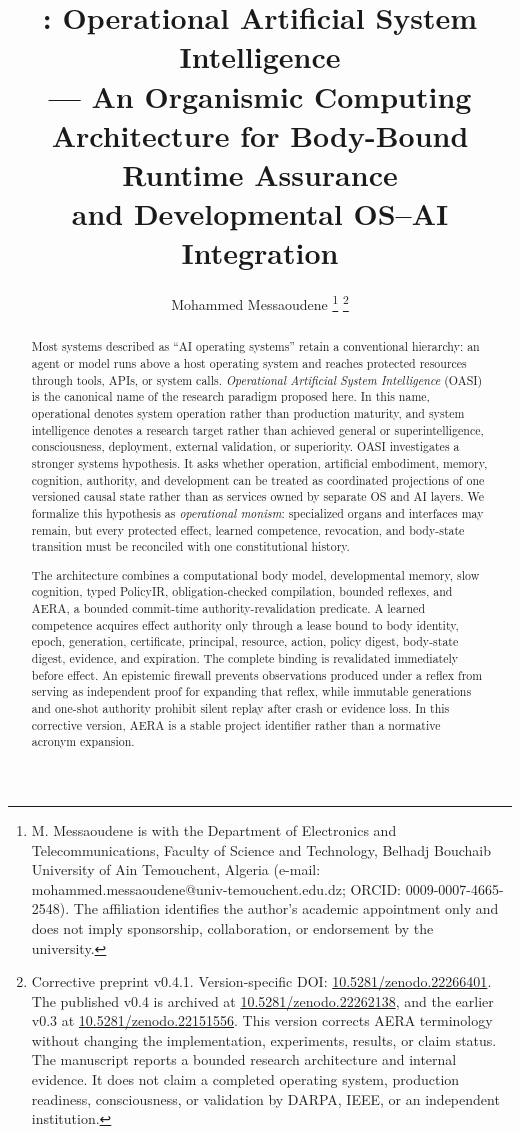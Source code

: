 \documentclass[journal,10pt]{IEEEtran}
\title{\OASI{}: Operational Artificial System Intelligence\\
{\large --- An Organismic Computing Architecture for Body-Bound Runtime Assurance\\
and Developmental OS--AI Integration}}
\author{Mohammed Messaoudene%
\thanks{M. Messaoudene is with the Department of Electronics and Telecommunications, Faculty of Science and Technology, Belhadj Bouchaib University of Ain Temouchent, Algeria (e-mail: mohammed.messaoudene@univ-temouchent.edu.dz; ORCID: 0009-0007-4665-2548). The affiliation identifies the author's academic appointment only and does not imply sponsorship, collaboration, or endorsement by the university.}%
\thanks{Corrective preprint v0.4.1. Version-specific DOI: \href{https://doi.org/10.5281/zenodo.22266401}{10.5281/zenodo.22266401}. The published v0.4 is archived at \href{https://doi.org/10.5281/zenodo.22262138}{10.5281/zenodo.22262138}, and the earlier v0.3 at \href{https://doi.org/10.5281/zenodo.22151556}{10.5281/zenodo.22151556}. This version corrects AERA terminology without changing the implementation, experiments, results, or claim status. The manuscript reports a bounded research architecture and internal evidence. It does not claim a completed operating system, production readiness, consciousness, or validation by DARPA, IEEE, or an independent institution.}}
\newcommand{\OASI}{\textsc{OASI}}
\newcommand{\AERA}{\textsc{AERA}}
\begin{document}
\maketitle

\begin{abstract}
Most systems described as ``AI operating systems'' retain a conventional hierarchy: an agent or model runs above a host operating system and reaches protected resources through tools, APIs, or system calls. \emph{Operational Artificial System Intelligence} (\OASI{}) is the canonical name of the research paradigm proposed here. In this name, operational denotes system operation rather than production maturity, and system intelligence denotes a research target rather than achieved general or superintelligence, consciousness, deployment, external validation, or superiority. \OASI{} investigates a stronger systems hypothesis. It asks whether operation, artificial embodiment, memory, cognition, authority, and development can be treated as coordinated projections of one versioned causal state rather than as services owned by separate OS and AI layers. We formalize this hypothesis as \emph{operational monism}: specialized organs and interfaces may remain, but every protected effect, learned competence, revocation, and body-state transition must be reconciled with one constitutional history.

The architecture combines a computational body model, developmental memory, slow cognition, typed PolicyIR, obligation-checked compilation, bounded reflexes, and \AERA, a bounded commit-time authority-revalidation predicate. A learned competence acquires effect authority only through a lease bound to body identity, epoch, generation, certificate, principal, resource, action, policy digest, body-state digest, evidence, and expiration. The complete binding is revalidated immediately before effect. An epistemic firewall prevents observations produced under a reflex from serving as independent proof for expanding that reflex, while immutable generations and one-shot authority prohibit silent replay after crash or evidence loss. In this corrective version, \AERA{} is a stable project identifier rather than a normative acronym expansion.


\end{abstract}
\end{document}
